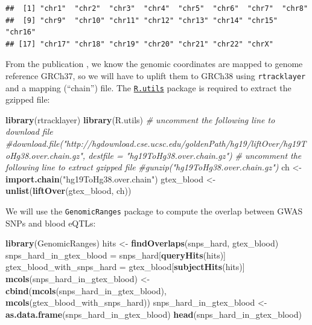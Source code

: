 \documentclass[9pt,a4paper,]{extarticle}
\newenvironment{Shaded}{\begin{snugshade}}{\end{snugshade}}
\newcommand{\KeywordTok}[1]{\textcolor[rgb]{0.13,0.29,0.53}{\textbf{#1}}}
\newcommand{\StringTok}[1]{\textcolor[rgb]{0.31,0.60,0.02}{#1}}
\newcommand{\CommentTok}[1]{\textcolor[rgb]{0.56,0.35,0.01}{\textit{#1}}}
\newcommand{\NormalTok}[1]{#1}
\begin{document}
\begin{verbatim}
##  [1] "chr1"  "chr2"  "chr3"  "chr4"  "chr5"  "chr6"  "chr7"  "chr8" 
##  [9] "chr9"  "chr10" "chr11" "chr12" "chr13" "chr14" "chr15" "chr16"
## [17] "chr17" "chr18" "chr19" "chr20" "chr21" "chr22" "chrX"
\end{verbatim}

From the publication \citep{GTEx2017}, we know the genomic coordinates are mapped to genome reference GRCh37, so we will have to uplift them to GRCh38 using \texttt{rtracklayer} \citep{Lawrence2009} and a mapping (``chain'') file.
The \href{https://cran.r-project.org/package=R.utils}{\texttt{R.utils}} package is required to extract the gzipped file:

\begin{Shaded}
\begin{Highlighting}[]
\KeywordTok{library}\NormalTok{(rtracklayer)}
\KeywordTok{library}\NormalTok{(R.utils)}
\CommentTok{# uncomment the following line to download file}
\CommentTok{#download.file("http://hgdownload.cse.ucsc.edu/goldenPath/hg19/liftOver/hg19ToHg38.over.chain.gz", destfile = "hg19ToHg38.over.chain.gz")}
\CommentTok{# uncomment the following line to extract gzipped file}
\CommentTok{#gunzip("hg19ToHg38.over.chain.gz")}
\NormalTok{ch <-}\StringTok{ }\KeywordTok{import.chain}\NormalTok{(}\StringTok{"hg19ToHg38.over.chain"}\NormalTok{)}
\NormalTok{gtex_blood <-}\StringTok{ }\KeywordTok{unlist}\NormalTok{(}\KeywordTok{liftOver}\NormalTok{(gtex_blood, ch))}
\end{Highlighting}
\end{Shaded}

We will use the \texttt{GenomicRanges} package \citep{Lawrence2013} to compute the overlap between GWAS SNPs and blood eQTLs:

\begin{Shaded}
\begin{Highlighting}[]
\KeywordTok{library}\NormalTok{(GenomicRanges)}
\NormalTok{hits <-}\StringTok{ }\KeywordTok{findOverlaps}\NormalTok{(snps_hard, gtex_blood)}
\NormalTok{snps_hard_in_gtex_blood =}\StringTok{ }\NormalTok{snps_hard[}\KeywordTok{queryHits}\NormalTok{(hits)]}
\NormalTok{gtex_blood_with_snps_hard =}\StringTok{ }\NormalTok{gtex_blood[}\KeywordTok{subjectHits}\NormalTok{(hits)]}
\KeywordTok{mcols}\NormalTok{(snps_hard_in_gtex_blood) <-}\StringTok{ }\KeywordTok{cbind}\NormalTok{(}\KeywordTok{mcols}\NormalTok{(snps_hard_in_gtex_blood), }\KeywordTok{mcols}\NormalTok{(gtex_blood_with_snps_hard))}
\NormalTok{snps_hard_in_gtex_blood <-}\StringTok{ }\KeywordTok{as.data.frame}\NormalTok{(snps_hard_in_gtex_blood)}
\KeywordTok{head}\NormalTok{(snps_hard_in_gtex_blood)}
\end{Highlighting}
\end{Shaded}
\end{document}
